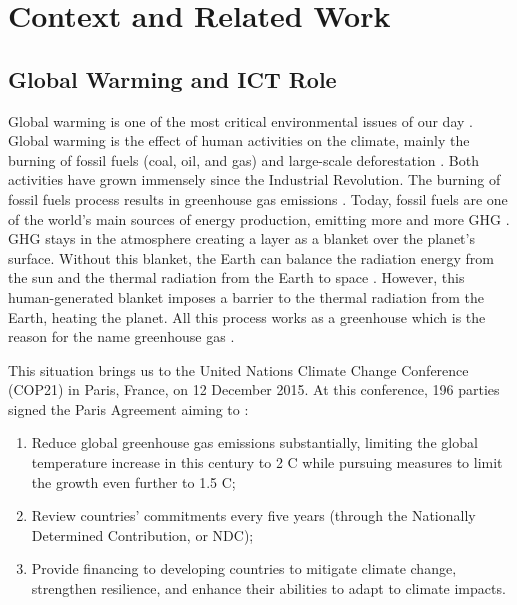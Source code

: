 \chapter{Context and Related Work}
\label{cha:related_work}
\minitoc

\section{Global Warming and ICT Role}
Global warming is one of the most critical environmental issues of our day \cite{houghton2005global}. Global warming is the effect of human activities on the climate, mainly the burning of fossil fuels (coal, oil, and gas) and large-scale deforestation \cite{houghton2005global}. Both activities have grown immensely since the Industrial Revolution. The burning of fossil fuels process results in greenhouse gas emissions \cite{olabi2022renewable}. Today, fossil fuels are one of the world's main sources of energy production, emitting more and more GHG \cite{olabi2022renewable}. GHG stays in the atmosphere creating a layer as a blanket over the planet's surface. Without this blanket, the Earth can balance the radiation energy from the sun and the thermal radiation from the Earth to space \cite{houghton2005global}. However, this human-generated blanket imposes a barrier to the thermal radiation from the Earth, heating the planet. All this process works as a greenhouse which is the reason for the name greenhouse gas \cite{houghton2005global}.

This situation brings us to the United Nations Climate Change Conference (COP21) in Paris, France, on 12 December 2015. At this conference, 196 parties signed the Paris Agreement aiming to \cite{nations_paris_nodate}:
\begin{enumerate}
    \item Reduce global greenhouse gas emissions substantially, limiting the global temperature increase in this century to 2 \degree C while pursuing measures to limit the growth even further to 1.5 \degree C;
    \item Review countries’ commitments every five years (through the Nationally Determined Contribution, or NDC);
    \item Provide financing to developing countries to mitigate climate change, strengthen resilience, and enhance their abilities to adapt to climate impacts. 
\end{enumerate}


